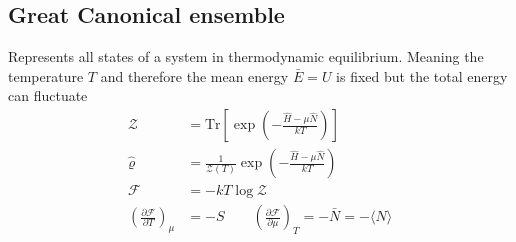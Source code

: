 \documentclass[10pt,a4paper]{book}
\theoremstyle{definition}
\begin{document}
\subsection{Great Canonical ensemble}
Represents all states of a system in thermodynamic equilibrium. Meaning the temperature $T$ and therefore the mean energy $\bar{E}=U$ is fixed but the total energy can fluctuate
\begin{align}
\mathcal{Z}&=\text{Tr}\left[\exp\left(-\frac{\hat{H}-\mu\hat{N}}{kT}\right)\right]\\
\hat{\varrho}&=\frac{1}{\mathcal{Z}(T)}\exp\left(-\frac{\hat{H}-\mu\hat{N}}{kT}\right)\\
\mathcal{F}&=-kT\log \mathcal{Z}\\
\left(\frac{\partial \mathcal{F}}{\partial T}\right)_\mu&=-S
\qquad
\left(\frac{\partial \mathcal{F}}{\partial\mu}\right)_T=-\bar{N}=-\langle\hat{N}\rangle
\end{align}
\end{document}
